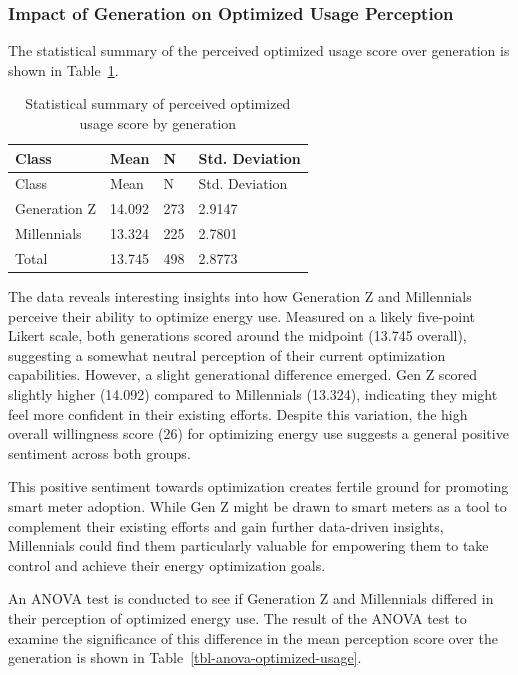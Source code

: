 \documentclass[
  letterpaper,
  DIV=11,
  numbers=noendperiod]{scrartcl}
\begin{document}
\subsubsection{Impact of Generation on Optimized Usage
Perception}\label{impact-of-generation-on-optimized-usage-perception}

The statistical summary of the perceived optimized usage score over
generation is shown in Table~\ref{tbl-optimized-usage-generation}.

\begin{longtable}[]{@{}llll@{}}
\caption{Statistical summary of perceived optimized usage score by
generation}\label{tbl-optimized-usage-generation}\tabularnewline
\toprule\noalign{}
Class & Mean & N & Std. Deviation \\
\midrule\noalign{}
\endfirsthead
\toprule\noalign{}
Class & Mean & N & Std. Deviation \\
\midrule\noalign{}
\endhead
\bottomrule\noalign{}
\endlastfoot
Generation Z & 14.092 & 273 & 2.9147 \\
Millennials & 13.324 & 225 & 2.7801 \\
Total & 13.745 & 498 & 2.8773 \\
\end{longtable}

The data reveals interesting insights into how Generation Z and
Millennials perceive their ability to optimize energy use. Measured on a
likely five-point Likert scale, both generations scored around the
midpoint (13.745 overall), suggesting a somewhat neutral perception of
their current optimization capabilities. However, a slight generational
difference emerged. Gen Z scored slightly higher (14.092) compared to
Millennials (13.324), indicating they might feel more confident in their
existing efforts. Despite this variation, the high overall willingness
score (26) for optimizing energy use suggests a general positive
sentiment across both groups.

This positive sentiment towards optimization creates fertile ground for
promoting smart meter adoption. While Gen Z might be drawn to smart
meters as a tool to complement their existing efforts and gain further
data-driven insights, Millennials could find them particularly valuable
for empowering them to take control and achieve their energy
optimization goals.

An ANOVA test is conducted to see if Generation Z and Millennials
differed in their perception of optimized energy use. The result of the
ANOVA test to examine the significance of this difference in the mean
perception score over the generation is shown in
Table~\ref{tbl-anova-optimized-usage}.
\end{document}
